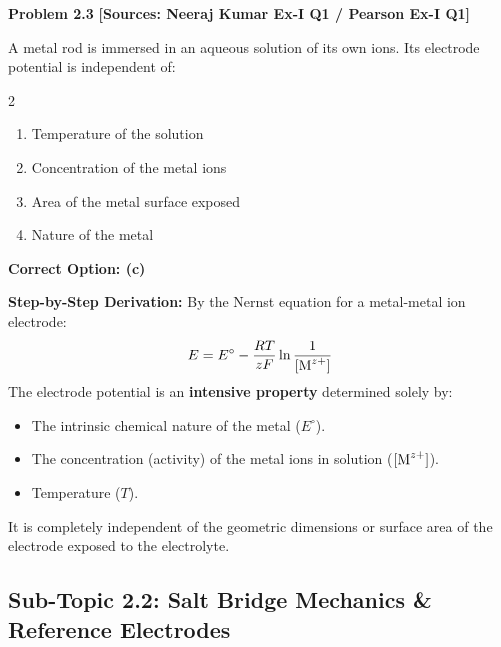 \begin{problembox}
\textbf{Problem 2.3} \hfill \textbf{[Sources: Neeraj Kumar Ex-I Q1 / Pearson Ex-I Q1]}

A metal rod is immersed in an aqueous solution of its own ions. Its electrode potential is independent of:
\begin{multicols}{2}
\begin{enumerate}[label=(\alph*)]
    \item Temperature of the solution
    \item Concentration of the metal ions
    \item Area of the metal surface exposed
    \item Nature of the metal
\end{enumerate}
\end{multicols}
\end{problembox}
\begin{solution}
\textbf{Correct Option: (c)}

\textbf{Step-by-Step Derivation:}
By the Nernst equation for a metal-metal ion electrode:
\begin{equation*}
    E = E^\circ - \frac{RT}{zF} \ln \frac{1}{[\ce{M^{z+}}]}
\end{equation*}
The electrode potential is an \textbf{intensive property} determined solely by:
\begin{itemize}
    \item The intrinsic chemical nature of the metal ($E^\circ$).
    \item The concentration (activity) of the metal ions in solution ($[\ce{M^{z+}}]$).
    \item Temperature ($T$).
\end{itemize}
It is completely independent of the geometric dimensions or surface area of the electrode exposed to the electrolyte.
\end{solution}

\subsection{Sub-Topic 2.2: Salt Bridge Mechanics \& Reference Electrodes}

